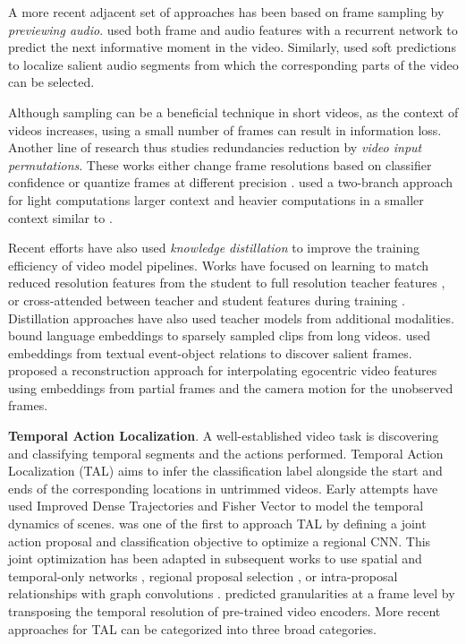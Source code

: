 \documentclass[smallextended,twocolumn,natbib]{svjour3}
\begin{document}
A more recent adjacent set of approaches has been based on frame sampling by \emph{previewing audio}. \citet{gao2020listen} used both frame and audio features with a recurrent network to predict the next informative moment in the video. Similarly, \citet{nugroho2023audio} used soft predictions to localize salient audio segments from which the corresponding parts of the video can be selected. 

Although sampling can be a beneficial technique in short videos, as the context of videos increases, using a small number of frames can result in information loss. Another line of research thus studies redundancies reduction by \emph{video input permutations}. These works either change frame resolutions based on classifier confidence \citep{meng2020ar} or quantize frames at different precision \citep{abati2023resq,sun2021dynamic}. \citet{zhang2022look} used a two-branch approach for light computations larger context and heavier computations in a smaller context similar to \citep{feichtenhofer2019slowfast}.  

Recent efforts have also used \emph{knowledge distillation} to improve the training efficiency of video model pipelines. Works have focused on learning to match reduced resolution features from the student to full resolution teacher features \citep{ma2022rethinking}, or cross-attended between teacher and student features during training \citep{kim2021efficient}. Distillation approaches have also used teacher models from additional modalities. \citet{lei2021less} bound language embeddings to sparsely sampled clips from long videos. \citet{xia2022temporal} used embeddings from textual event-object relations to discover salient frames. \citet{tan2023egodistill} proposed a reconstruction approach for interpolating egocentric video features using embeddings from partial frames and the camera motion for the unobserved frames.

\noindent
\textbf{Temporal Action Localization}. A well-established video task is discovering and classifying temporal segments and the actions performed. Temporal Action Localization (TAL) aims to infer the classification label alongside the start and ends of the corresponding locations in untrimmed videos. Early attempts have used Improved Dense Trajectories \citep{wang2013action} and Fisher Vector \citep{oneata2013action} to model the temporal dynamics of scenes. \citet{shou2016temporal} was one of the first to approach TAL by defining a joint action proposal and classification objective to optimize a regional CNN. This joint optimization has been adapted in subsequent works to use spatial and temporal-only networks \citep{lin2018bsn,paul2018w,wang2017untrimmednets}, regional proposal selection \citep{chao2018rethinking,xu2017r}, or intra-proposal relationships with graph convolutions \citep{zeng2019graph}. \citet{shou2017cdc} predicted granularities at a frame level by transposing the temporal resolution of pre-trained video encoders. More recent approaches for TAL can be categorized into three broad categories. 
\end{document}

